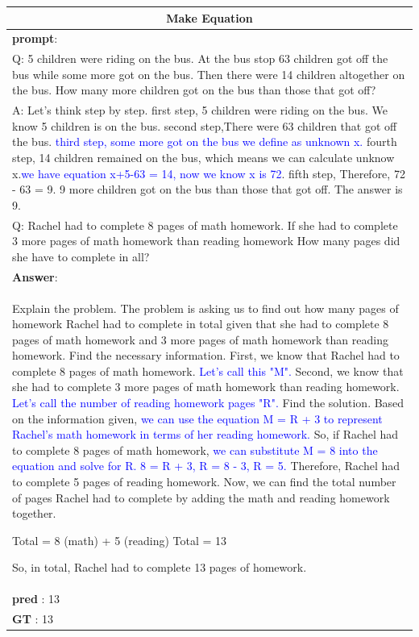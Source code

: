 \documentclass[11pt]{article}
\begin{document}
\begin{table}[htbp]
\begin{tabularx}{\textwidth}{X}
    \toprule
    \multicolumn{1}{c}{\textbf{Make Equation}} \\
    \midrule
\textbf{prompt}: \\
Q: 5 children were riding on the bus. At the bus stop 63 children got off the bus while some more got on the bus. Then there were 14 children altogether on the bus. How many more children got on the bus than those that got off?\\
A: Let's think step by step. first step, 5 children were riding on the bus. We know 5 children is on the bus. second step,There were 63 children that got off the bus. \textcolor{blue}{third step, some more got on the bus we define as unknown x.} fourth step, 14 children remained on the bus, which means we can calculate unknow x.\textcolor{blue}{we have equation x+5-63 = 14, now we know x is 72}. fifth step, Therefore, 72 - 63 = 9. 9 more children got on the bus than those that got off. The answer is 9.\\
Q: Rachel had to complete 8 pages of math homework. If she had to complete 3 more pages of math homework than reading homework How many pages did she have to complete in all?\\
\midrule
\textbf{Answer}:\\
Explain the problem. The problem is asking us to find out how many pages of homework Rachel had to complete in total given that she had to complete 8 pages of math homework and 3 more pages of math homework than reading homework. Find the necessary information. First, we know that Rachel had to complete 8 pages of math homework. \textcolor{blue}{Let's call this "M".} Second, we know that she had to complete 3 more pages of math homework than reading homework.\textcolor{blue}{ Let's call the number of reading homework pages "R".} Find the solution. Based on the information given, \textcolor{blue}{we can use the equation M = R + 3 to represent Rachel's math homework in terms of her reading homework.} So, if Rachel had to complete 8 pages of math homework, \textcolor{blue}{we can substitute M = 8 into the equation and solve for R. 8 = R + 3, R = 8 - 3, R = 5.} Therefore, Rachel had to complete 5 pages of reading homework. Now, we can find the total number of pages Rachel had to complete by adding the math and reading homework together.

Total = 8 (math) + 5 (reading)
Total = 13

So, in total, Rachel had to complete 13 pages of homework.\\
\textbf{pred} : 13\\
\textbf{GT} : 13\\\bottomrule
  \end{tabularx}
\end{table}
\end{document}
